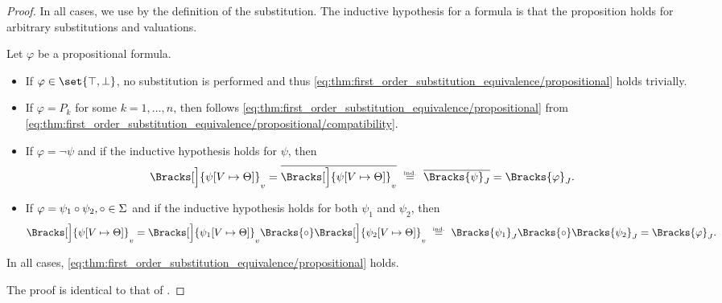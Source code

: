 \begin{proof}
  In all cases, we use  by the definition of the substitution. The inductive hypothesis for a formula is that the proposition holds for arbitrary substitutions and valuations.

   Let \( \varphi \) be a propositional formula.
  \begin{itemize}
    \item If \( \varphi \in \set{ \top, \bot } \), no substitution is performed and thus \eqref{eq:thm:first_order_substitution_equivalence/propositional} holds trivially.

    \item If \( \varphi = P_k \) for some \( k = 1, \ldots, n \), then follows \eqref{eq:thm:first_order_substitution_equivalence/propositional} from \eqref{eq:thm:first_order_substitution_equivalence/propositional/compatibility}.

    \item If \( \varphi = \neg \psi \) and if the inductive hypothesis holds for \( \psi \), then
    \begin{equation*}
      \Bracks[\Big]{ \psi[V \mapsto \Theta] }_v
      =
      \overline{\Bracks[\Big]{ \psi[V \mapsto \Theta] }_v}
      \reloset {\T{ind.}} =
      \overline{\Bracks{\psi}_J}
      =
      \Bracks{\varphi}_J.
    \end{equation*}

    \item If \( \varphi = \psi_1 \bincirc \psi_2, \bincirc \in \Sigma \) and if the inductive hypothesis holds for both \( \psi_1 \) and \( \psi_2 \), then
    \begin{equation*}
      \Bracks[\Big]{ \psi[V \mapsto \Theta] }_v
      =
      \Bracks[\Big]{ \psi_1[V \mapsto \Theta] }_v \Bracks{\bincirc} \Bracks[\Big]{ \psi_2[V \mapsto \Theta] }_v
      \reloset {\T{ind.}} =
      \Bracks{\psi_1}_J \Bracks{\bincirc} \Bracks{\psi_2}_J
      =
      \Bracks{\varphi}_J.
    \end{equation*}
  \end{itemize}

  In all cases, \eqref{eq:thm:first_order_substitution_equivalence/propositional} holds.

   The proof is identical to that of .


\end{proof}

